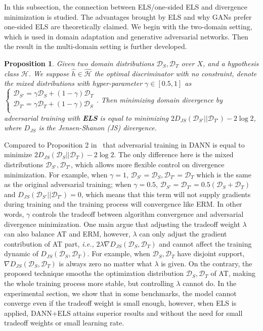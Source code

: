 \documentclass{article} \usepackage{iclr2023_conference,times}
\newtheorem{prop}{Proposition}
\newcommand{\abbr}[0]{DANN+ELS\xspace}
\newcommand{\ls}[0]{ELS\xspace}
\newcommand{\ie}[0]{\textit{i.e., }}
\newcommand{\D}{\mathcal{D}}
\begin{document}
In this subsection, the connection between \ls/one-sided \ls and divergence minimization is studied. The advantages brought by \ls and why GANs prefer one-sided \ls are theoretically claimed. We begin with the two-domain setting, which is used in domain adaptation and generative adversarial networks. Then the result in the multi-domain setting is further developed.
\begin{prop}
Given two domain distributions $\mathcal{D}_S,\mathcal{D}_T$ over $X$, and a hypothesis class $\mathcal{H}$. We suppose $\hat{h}\in\hat{\mathcal{H}}$ the optimal discriminator with no constraint, denote the mixed distributions with hyper-parameter $\gamma\in[0.5,1]$ as $\left\{         \begin{array}{c} 
    \D_{S'}=\gamma\D_S+(1-\gamma)\D_T\\ 
    \D_{T'}=\gamma\D_T+(1-\gamma)\D_S\\ 
  \end{array}\right.$. Then minimizing domain divergence by adversarial training with \textbf{\ls} is equal to minimizing $2D_{JS}(\D_{S'}||\D_{T'})-2\log2$, where $D_{JS}$ is the Jensen-Shanon (JS) divergence.
  \label{prop1}
\end{prop}
Compared to Proposition 2 in~\citep{acuna2021f} that adversarial training in DANN is equal to minimize $2D_{JS}(\D_S||\D_T)-2\log2$. The only difference here is the mixed distributions $\D_{S'},\D_{T'}$, which allows more flexible control on divergence minimization. For example, when $\gamma=1$, $\D_{S'}=\D_S,\D_{T'}=\D_T$ which is the same as the original adversarial training; when $\gamma=0.5$, $\D_{S'}=\D_{T'}=0.5(\D_S+\D_T)$ and $D_{JS}(\D_{S'}||\D_{T'})=0$, which means that this term will not supply gradients during training and the training process will convergence like ERM. In other words, $\gamma$ controls the tradeoff between algorithm convergence and adversarial divergence minimization. One main argue that adjusting the tradeoff weight $\lambda$ can also balance AT and ERM, however, $\lambda$ can only adjust the gradient contribution of AT part, \ie $2\lambda \nabla D_{JS}(\D_S,\D_T)$ and cannot affect the training dynamic of $D_{JS}(\D_S,\D_T)$. For example, when $\D_S,\D_T$ have disjoint support, $\nabla D_{JS}(\D_S,\D_T)$ is always zero no matter what $\lambda$ is given. On the contrary, the proposed technique smooths the optimization distribution $\D_S,\D_T$ of AT, making the whole training process more stable, but controlling $\lambda$ cannot do. In the experimental section, we show that in some benchmarks, the model cannot converge even if the tradeoff weight is small enough, however, when \ls is applied, \abbr attains superior results and without the need for small tradeoff weights or small learning rate.
\end{document}
